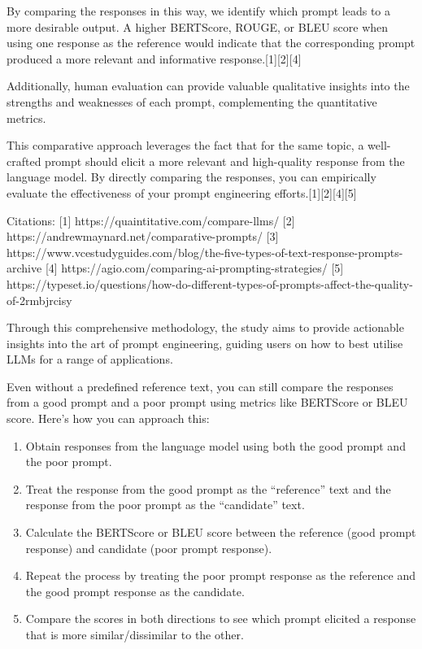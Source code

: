 \documentclass[
]{agujournal2019}
\providecommand{\tightlist}{%
  \setlength{\itemsep}{0pt}\setlength{\parskip}{0pt}}\usepackage{longtable,booktabs,array}
\begin{document}
By comparing the responses in this way, we identify which prompt leads
to a more desirable output. A higher BERTScore, ROUGE, or BLEU score
when using one response as the reference would indicate that the
corresponding prompt produced a more relevant and informative
response.{[}1{]}{[}2{]}{[}4{]}

Additionally, human evaluation can provide valuable qualitative insights
into the strengths and weaknesses of each prompt, complementing the
quantitative metrics.

This comparative approach leverages the fact that for the same topic, a
well-crafted prompt should elicit a more relevant and high-quality
response from the language model. By directly comparing the responses,
you can empirically evaluate the effectiveness of your prompt
engineering efforts.{[}1{]}{[}2{]}{[}4{]}{[}5{]}

Citations: {[}1{]} https://quaintitative.com/compare-llms/ {[}2{]}
https://andrewmaynard.net/comparative-prompts/ {[}3{]}
https://www.vcestudyguides.com/blog/the-five-types-of-text-response-prompts-archive
{[}4{]} https://agio.com/comparing-ai-prompting-strategies/ {[}5{]}
https://typeset.io/questions/how-do-different-types-of-prompts-affect-the-quality-of-2rmbjrcisy

Through this comprehensive methodology, the study aims to provide
actionable insights into the art of prompt engineering, guiding users on
how to best utilise LLMs for a range of applications.

Even without a predefined reference text, you can still compare the
responses from a good prompt and a poor prompt using metrics like
BERTScore or BLEU score. Here's how you can approach this:

\begin{enumerate}
\def\labelenumi{\arabic{enumi}.}
\tightlist
\item
  Obtain responses from the language model using both the good prompt
  and the poor prompt.
\item
  Treat the response from the good prompt as the ``reference'' text and
  the response from the poor prompt as the ``candidate'' text.
\item
  Calculate the BERTScore or BLEU score between the reference (good
  prompt response) and candidate (poor prompt response).
\item
  Repeat the process by treating the poor prompt response as the
  reference and the good prompt response as the candidate.
\item
  Compare the scores in both directions to see which prompt elicited a
  response that is more similar/dissimilar to the other.
\end{enumerate}
\end{document}
